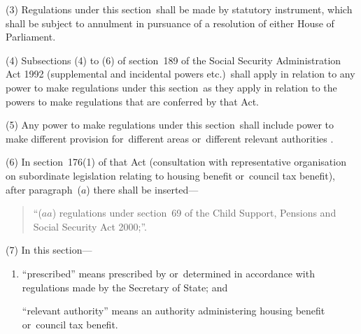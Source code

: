 \documentclass[12pt,a4paper]{article}
\begin{document}
(3) Regulations under this section~shall be made by statutory instrument, which shall be subject to annulment in pursuance of a resolution of either House of Parliament.

(4) Subsections (4)  to (6)  of section~189 of the Social Security Administration Act 1992 (supplemental and incidental powers etc.)\ shall apply in relation to any power to make regulations under this section~as they apply in relation to the powers to make regulations that are conferred by that Act.

(5) Any power to make regulations under this section~shall include power to make different provision for~different areas or~different 
relevant authorities%
.

(6) In section~176(1)  of that Act (consultation with representative organisation on subordinate legislation relating to housing benefit or~council tax benefit), after paragraph~($a$)  there shall be inserted—
\begin{quotation}
“($aa$) regulations under section~69 of the Child Support, Pensions and Social Security Act 2000;”.
\end{quotation}

(7) In this section—
\begin{enumerate}\item[]
    “prescribed” means prescribed by or~determined in accordance with regulations made by the Secretary of State; and

    “relevant authority” means an authority administering housing benefit or~council tax benefit. 

\end{enumerate}

\end{document}
